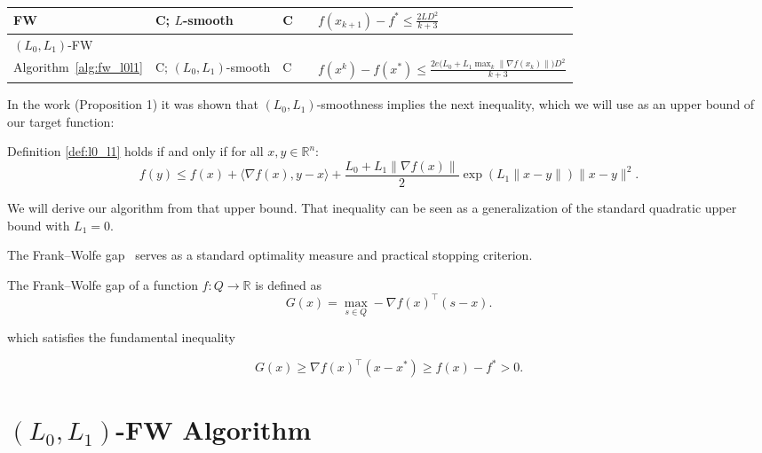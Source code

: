 \documentclass[runningheads]{llncs}
\begin{document}
\begin{table}[ht]
\begin{tabular}{|l|l|l|l|p{6cm}|}
			FW & C; $L$-smooth & C &  &
			{\scriptsize $f(x_{k+1}) - f^* \le \frac{2 L D^2}{k + 3}$}
			\\ \hline
			
			$(L_0,L_1)$-FW \\ Algorithm~\ref{alg:fw_l0l1} & C; $(L_0,L_1)$-smooth & C & &
			\parbox[t]{6cm}{\scriptsize
				$f(x^k) - f(x^*) \le \frac{2e \big(L_0 + L_1 \max_k \| \nabla f(x_k) \| \big) D^2}{k + 3}$
			}
			\\ \hline
		\end{tabular}
	\end{table}
	
	In the work \cite{chen2023generalized} (Proposition 1) it was shown that $(L_0, L_1)$-smoothness implies the next inequality, which we will use as an upper bound of our target function:
	
	\begin{lemma}\label{lemma:upper_bnd}
		Definition \ref{def:l0_l1} holds if and only if for all $x, y \in \mathbb{R}^n$:
		\begin{equation*}
			f(y) \leq f(x) + \langle \nabla f(x), y - x \rangle 
			+ \frac{L_0 + L_1 \|\nabla f(x)\|}{2} \exp\left( L_1 \|x - y\| \right) \|x - y\|^2 .
		\end{equation*}
	\end{lemma}
	
	We will derive our algorithm from that upper bound. That inequality can be seen as a generalization of the standard quadratic upper bound \cite{nesterov2018lectures} with $L_1 = 0$.
	
	The Frank–Wolfe gap~\cite{bomze2021frank,braun2022conditional} serves as a standard optimality measure and practical stopping criterion.
	
	\begin{definition}\label{def:fw_gap}
		The Frank–Wolfe gap of a function $f: Q \to \mathbb{R}$ is defined as
		\begin{equation*}
			G(x) = \max_{s \in Q} - \nabla f(x)^\top(s - x).
		\end{equation*}
	\end{definition}
	
	which satisfies the fundamental inequality
	
	\begin{equation}\label{fw_gap}
		G(x) \geq \nabla f(x)^\top (x - x^*) \geq f(x) - f^* > 0.
	\end{equation}
	
	\section{$(L_0,L_1)$-FW Algorithm}
	
\end{document}
